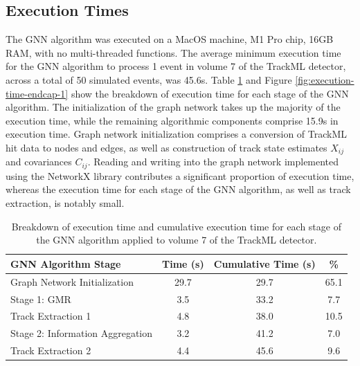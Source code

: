 \subsection{Execution Times}

The GNN algorithm was executed on a MacOS machine, M1 Pro chip, 16GB RAM, with no multi-threaded functions. The average minimum execution time for the GNN algorithm to process 1 event in volume 7 of the TrackML detector, across a total of 50 simulated events, was 45.6s. Table \ref{tab:trackml-endcap-execution-times} and Figure \ref{fig:execution-time-endcap-1} show the breakdown of execution time for each stage of the GNN algorithm. The initialization of the graph network takes up the majority of the execution time, while the remaining algorithmic components comprise 15.9s in execution time. Graph network initialization comprises a conversion of TrackML hit data to nodes and edges, as well as construction of track state estimates $X_{ij}$ and covariances $C_{ij}$. Reading and writing into the graph network implemented using the NetworkX library contributes a significant proportion of execution time, whereas the execution time for each stage of the GNN algorithm, as well as track extraction, is notably small.

\begin{table}[!htbp]
\caption{Breakdown of execution time and cumulative execution time for each stage of the GNN algorithm applied to volume 7 of the TrackML detector.}
\begin{center}
\begin{tabular}{lccc}
\toprule
GNN Algorithm Stage & Time (s) & Cumulative Time (s) & \% \\
\hline
Graph Network Initialization    & 29.7  & 29.7  &  65.1    \\
Stage 1: GMR                    & 3.5   & 33.2   &  7.7    \\
Track Extraction 1              & 4.8   & 38.0   &  10.5    \\
Stage 2: Information Aggregation & 3.2   & 41.2   &  7.0    \\
Track Extraction 2              & 4.4   & 45.6   &  9.6    \\
\bottomrule
\end{tabular}
\end{center}
\label{tab:trackml-endcap-execution-times}
\end{table}

